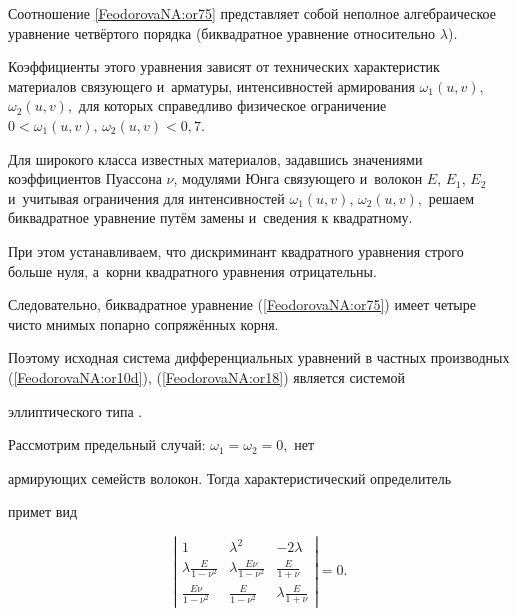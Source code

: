 Соотношение \eqref{FeodorovaNA:or75} представляет собой неполное алгебраическое уравнение четвёртого порядка (биквадратное уравнение относительно $\lambda$).

Коэффициенты этого уравнения зависят от технических характеристик материалов связующего и~арматуры, интенсивностей армирования $\omega_1(u,v)$, $\omega_2(u,v),$ для которых справедливо физическое ограничение $0<\omega_1(u, v),\, \omega_2(u, v)<0{,}7.$ 

Для широкого класса известных материалов, задавшись значениями коэффициентов Пуассона $\nu$, модулями Юнга связующего и~волокон $E$, $E_1$, $E_2$  и~учитывая ограничения для интенсивностей $\omega_1(u,v)$, $\omega_2(u,v),$ решаем биквадратное уравнение путём замены и~сведения к квадратному. 

При этом устанавливаем, что дискриминант квадратного уравнения строго больше нуля, а~корни квадратного уравнения отрицательны. 

Следовательно, биквадратное уравнение (\ref{FeodorovaNA:or75}) имеет четыре чисто мнимых попарно сопряжённых корня.




Поэтому исходная система дифференциальных уравнений в частных производных (\ref{FeodorovaNA:or10d}), (\ref{FeodorovaNA:or18}) является системой

эллиптического типа \cite{FeodorovaNA:Bi2}.



Рассмотрим предельный случай: $\omega_1=\omega_2=0,$ нет

армирующих семейств волокон. Тогда характеристический определитель

примет вид

\[ \left|

\begin{array}{ccc}

1&\lambda^2& -2\lambda\\

\lambda\frac{E}{1-\nu^2}&\lambda\frac{E\nu}{1-\nu^2} &\frac{E}{1+\nu} \\

\frac{E\nu}{1-\nu^2} &\frac{E}{1-\nu^2}&\lambda\frac{E}{1+\nu}

\end{array} \right|=0.

\]

